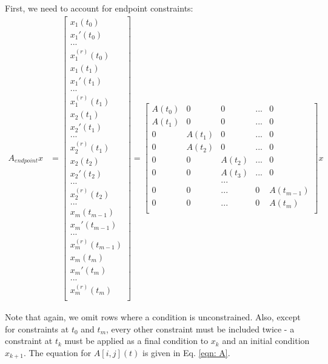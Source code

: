 \documentclass[11pt]{article}
\begin{document}
\mbox{} \newline
First, we need to account for endpoint constraints: 
\begin{align*}
A_{endpoint} x &= 
\begin{bmatrix}
  x_1 (t_0) \\
  x_1' (t_0) \\
  ... \\
  x^{(r)}_1 (t_0) \\
    x_1 (t_1) \\
  x_1' (t_1) \\
  ... \\
  x^{(r)}_1 (t_1) \\
      x_2 (t_1) \\
  x_2' (t_1) \\
  ... \\
  x^{(r)}_2 (t_1) \\
      x_2 (t_2) \\
  x_2' (t_2) \\
  ... \\
  x^{(r)}_2 (t_2) \\
  ... \\
        x_m (t_{m-1}) \\
  x_m' (t_{m-1}) \\
  ... \\
  x^{(r)}_m (t_{m-1}) \\
      x_m (t_m) \\
  x_m' (t_m) \\
  ... \\
  x^{(r)}_m (t_m) \\
 \end{bmatrix}
 = 
 \begin{bmatrix}
 A(t_0) & 0 & 0 & ... & 0 \\
 A(t_1) & 0 & 0 & ... & 0 \\
 0 & A(t_1) & 0 & ... & 0 \\
 0 & A(t_2) & 0 & ... & 0 \\
 0 & 0 & A(t_2) & ... & 0 \\
 0 & 0 & A(t_3) & ... & 0 \\
 & & ... & & \\
 0 & 0 & ... & 0 & A(t_{m-1}) \\
 0 & 0 & ... & 0 & A(t_m)  \\
 \end{bmatrix}
 x
\end{align*}

Note that again, we omit rows where a condition is unconstrained. Also, except for constraints at $t_0$ and $t_m$, every other constraint must be included twice - a constraint at $t_k$ must be applied as a final condition to $x_{k}$ and an initial condition $x_{k+1}$. The equation for $A[i, j] (t)$ is given in Eq. \ref{eqn: A}. 
\end{document}
